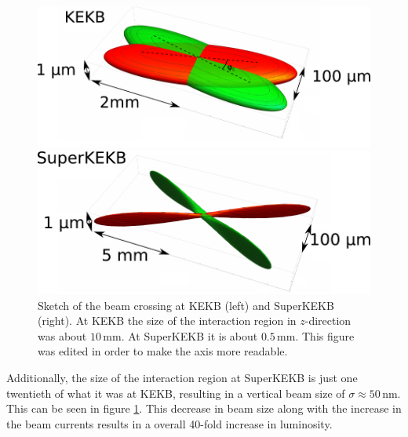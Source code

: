 \documentclass[a4paper,11pt,twosided,final,german,openbib,pdftex,listof=totoc,bibliography=totoc]{scrbook}
\begin{document}
\begin{figure}[h!]
	\centering
	\begin{minipage}[b]{0.45\linewidth}
		\centering
		\includegraphics[width=\textwidth]{Bilder/BeamBelle}
	\end{minipage}
	\hspace{0.5cm}
	\begin{minipage}[b]{0.45\linewidth}
		\centering
		\includegraphics[width=\textwidth]{Bilder/SuperKEKBBeam}
	\end{minipage}
		\caption[Sketch Of The Beam Crossing For KEKB And SuperKEKB]{Sketch of the beam crossing at KEKB (left) and SuperKEKB (right). At KEKB the size of the interaction region in $z$-direction was about $10\,\textrm{mm}$. At SuperKEKB it is about $0.5\,\textrm{mm}$.\cite{Beamsize} This figure was edited in order to make the axis more readable.}
	\label{fig:beamsize}

\end{figure}


Additionally, the size of the interaction region at SuperKEKB is just one twentieth of what it was at KEKB, resulting in a vertical beam size of $\sigma \approx 50\,\textrm{nm} $. This can be seen in figure \ref{fig:beamsize}. This decrease in beam size along with the increase in the beam currents  results in a overall 40-fold increase in luminosity.  \cite{B2TR} \cite{B2B}
\end{document}
